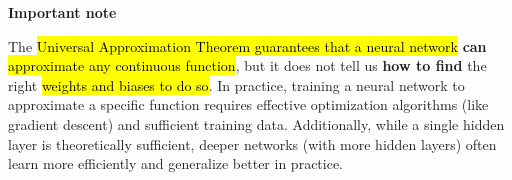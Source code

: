 \highspace
\begin{flushleft}
    \textcolor{Red2}{ \textbf{Important note}}
\end{flushleft}
The \hl{Universal Approximation Theorem guarantees that a neural network} \textbf{can} \hl{approximate any continuous function}, but it does not tell us \textbf{how to find} the right \hl{weights and biases to do so}. In practice, training a neural network to approximate a specific function requires effective optimization algorithms (like gradient descent) and sufficient training data. Additionally, while a single hidden layer is theoretically sufficient, deeper networks (with more hidden layers) often learn more efficiently and generalize better in practice.